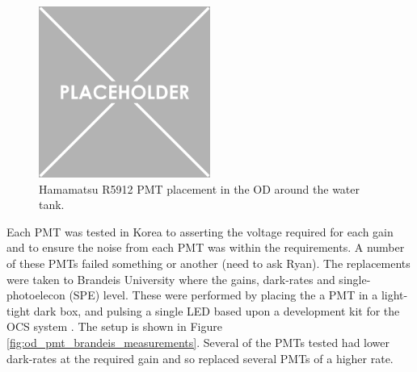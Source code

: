 \begin{figure}
    \centering
    \includegraphics[width=0.5\textwidth]{Figures/Placeholder.png}
    \caption{Hamamatsu R5912 PMT placement in the OD around the water tank.}
    \label{fig:od_pmt_placement}
\end{figure}




\par
Each PMT was tested in Korea to asserting the voltage required for each gain and to ensure the noise from each PMT was within the requirements.
A number of these PMTs failed something or another (need to ask Ryan).
The replacements were taken to Brandeis University where the gains, dark-rates and single-photoelecon (SPE) level.
These were performed by placing the a PMT in a light-tight dark box, and pulsing a single LED based upon a development kit for the OCS system \cite{lz_ocs_system_ref}.
The setup is shown in Figure \ref{fig:od_pmt_brandeis_measurements}.
Several of the PMTs tested had lower dark-rates at the required gain and so replaced several PMTs of a higher rate.

